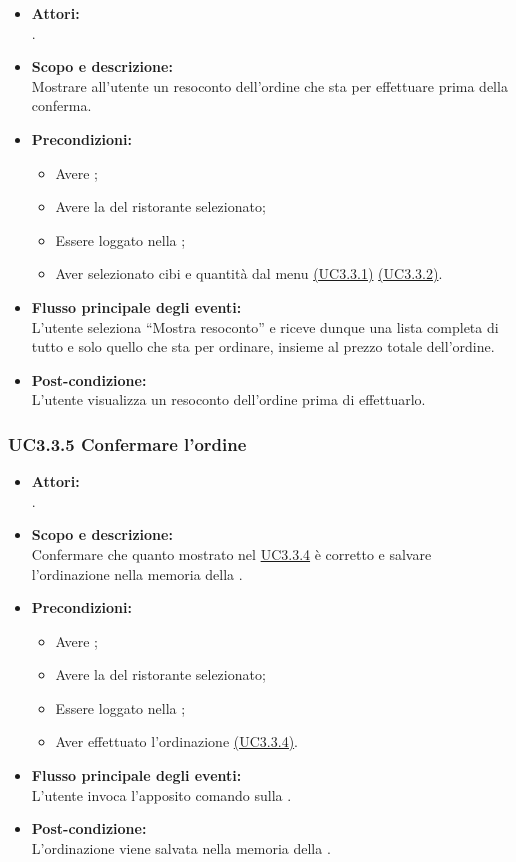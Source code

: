 \begin{itemize}
	\item \textbf{Attori:}
	\\.
	\item \textbf{Scopo e descrizione:} 
	\\Mostrare all'utente un resoconto dell'ordine che sta per effettuare prima della conferma.
	\item \textbf{Precondizioni:}
	\begin{itemize}
		\item Avere ;
		\item Avere la  del ristorante selezionato;
		\item Essere loggato nella ;
		\item Aver selezionato cibi e quantità dal menu \hyperref[UC3.3.1]{(UC3.3.1)} \hyperref[UC3.3.2]{(UC3.3.2)}.
	\end{itemize}
	\item \textbf{Flusso principale degli eventi:}
	\\L'utente seleziona “Mostra resoconto” e riceve dunque una lista completa di tutto e solo quello che sta per ordinare, insieme al prezzo totale dell'ordine.
	\item \textbf{Post-condizione:}
	\\L'utente visualizza un resoconto dell'ordine prima di effettuarlo.
\end{itemize}

\subsubsection{UC3.3.5 Confermare l'ordine} \label{UC3.3.5}

\begin{itemize}
	\item \textbf{Attori:}
	\\.
	\item \textbf{Scopo e descrizione:} 
	\\Confermare che quanto mostrato nel  \hyperref[UC3.3.4]{UC3.3.4} è corretto e salvare l'ordinazione nella memoria della .
	\item \textbf{Precondizioni:}
	\begin{itemize}
		\item Avere ;
		\item Avere la  del ristorante selezionato;
		\item Essere loggato nella ;
		\item Aver effettuato l'ordinazione \hyperref[UC3.3.4]{(UC3.3.4)}.
	\end{itemize}
	\item \textbf{Flusso principale degli eventi:}
	\\L'utente invoca l'apposito comando sulla .
	\item \textbf{Post-condizione:}
	\\L'ordinazione viene salvata nella memoria della .
\end{itemize}

